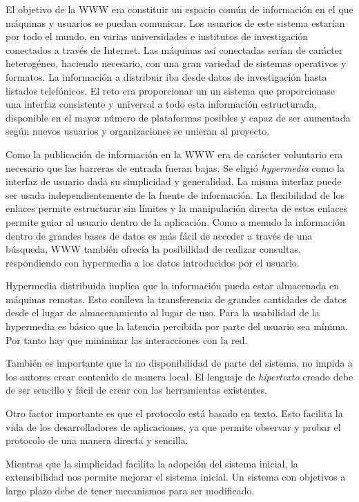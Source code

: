 El objetivo de la WWW era constituir un espacio común de información
en el que máquinas y usuarios se puedan comunicar.  Los usuarios de
este sistema estarían por todo el mundo, en varias universidades e
institutos de investigación conectados a través de Internet. Las
máquinas así conectadas serían de carácter heterogéneo, haciendo
necesario, con una gran variedad de sistemas operativos y formatos. La
información a distribuir iba desde datos de investigación hasta
listados telefónicos. El reto era proporcionar un un sistema que
proporcionase una interfaz consistente y universal a todo esta
información estructurada, disponible en el mayor número de plataformas
posibles y capaz de ser aumentada según nuevos usuarios y
organizaciones se unieran al proyecto.

Como la publicación de información en la WWW era de carácter
voluntario era necesario que las barreras de entrada fueran bajas. Se
eligió \emph{hypermedia} como la interfaz de usuario dada su
simplicidad y generalidad. La misma interfaz puede ser usada
independientemente de la fuente de información. La flexibilidad de los
enlaces permite estructurar sin límites y la manipulación directa de
estos enlaces permite guiar al usuario dentro de la aplicación. Como a
menudo la información dentro de grandes bases de datos es más fácil de
acceder a través de una búsqueda, WWW también ofrecía la posibilidad
de realizar consultas, respondiendo con hypermedia a los datos
introducidos por el usuario.

Hypermedia distribuida implica que la información pueda estar
almacenada en máquinas remotas. Esto conlleva la transferencia de
grandes cantidades de datos desde el lugar de almacenamiento al lugar
de uso. Para la usabilidad de la hypermedia es básico que la latencia
percibida por parte del usuario sea mínima. Por tanto hay que
minimizar las interacciones con la red.

También es importante que la no disponibilidad de parte del sistema,
no impida a los autores crear contenido de manera local. El lenguaje
de \emph{hipertexto} creado debe de ser sencillo y fácil de crear con
las herramientas existentes.

Otro factor importante es que el protocolo está basado en texto. Esto
facilita la vida de los desarrolladores de aplicaciones, ya que
permite observar y probar el protocolo de una manera directa y
sencilla.

Mientras que la simplicidad facilita la adopción del sistema inicial,
la extensibilidad nos permite mejorar el sistema inicial. Un sistema
con objetivos a largo plazo debe de tener mecanismos para ser
modificado.

